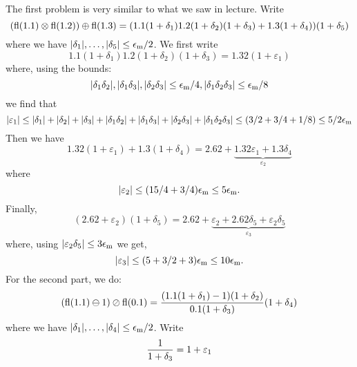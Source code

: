\documentclass[12pt,a4paper]{article}
\begin{document}
The first problem is very similar to what we saw in lecture. Write
\[
({\rm fl}(1.1)\ensuremath{\otimes} {\rm fl}(1.2)) \ensuremath{\oplus} {\rm fl}(1.3) = ( 1.1(1 + \ensuremath{\delta}_1)1.2(1+\ensuremath{\delta}_2)(1+\ensuremath{\delta}_3) + 1.3(1+\ensuremath{\delta}_4))(1+\ensuremath{\delta}_5)
\]
where we have $|\ensuremath{\delta}_1|,\ensuremath{\ldots},|\ensuremath{\delta}_5| \ensuremath{\leq} \ensuremath{\epsilon}_{\rm m}/2$. We first write
\[
1.1(1 + \ensuremath{\delta}_1)1.2(1+\ensuremath{\delta}_2)(1+\ensuremath{\delta}_3) = 1.32( 1+ \ensuremath{\varepsilon}_1)
\]
where, using the bounds:
\[
|\ensuremath{\delta}_1\ensuremath{\delta}_2|,|\ensuremath{\delta}_1\ensuremath{\delta}_3|,|\ensuremath{\delta}_2\ensuremath{\delta}_3| \ensuremath{\leq} \ensuremath{\epsilon}_{\rm m}/4, |\ensuremath{\delta}_1\ensuremath{\delta}_2\ensuremath{\delta}_3| \ensuremath{\leq} \ensuremath{\epsilon}_{\rm m}/8
\]
we find that
\[
|\ensuremath{\varepsilon}_1| \ensuremath{\leq} |\ensuremath{\delta}_1| + |\ensuremath{\delta}_2| + |\ensuremath{\delta}_3| + |\ensuremath{\delta}_1\ensuremath{\delta}_2| + |\ensuremath{\delta}_1\ensuremath{\delta}_3| + |\ensuremath{\delta}_2\ensuremath{\delta}_3|+ |\ensuremath{\delta}_1\ensuremath{\delta}_2\ensuremath{\delta}_3|
     \ensuremath{\leq} (3/2 + 3/4 + 1/8) \ensuremath{\leq} 5/2 \ensuremath{\epsilon}_{\rm m}
\]
Then we have
\[
1.32 (1 + \ensuremath{\varepsilon}_1) + 1.3 (1 + \ensuremath{\delta}_4) = 2.62 + \underbrace{1.32 \ensuremath{\varepsilon}_1 + 1.3\ensuremath{\delta}_4}_{\ensuremath{\varepsilon}_2}
\]
where
\[
|\ensuremath{\varepsilon}_2| \ensuremath{\leq} (15/4 + 3/4) \ensuremath{\epsilon}_{\rm m} \ensuremath{\leq} 5\ensuremath{\epsilon}_{\rm m}.
\]
Finally,
\[
(2.62 + \ensuremath{\varepsilon}_2)(1+\ensuremath{\delta}_5) = 2.62 + \underbrace{\ensuremath{\varepsilon}_2 + 2.62\ensuremath{\delta}_5 + \ensuremath{\varepsilon}_2 \ensuremath{\delta}_5}_{\ensuremath{\varepsilon}_3}
\]
where, using $|\ensuremath{\varepsilon}_2 \ensuremath{\delta}_5| \ensuremath{\leq} 3\ensuremath{\epsilon}_{\rm m}$ we get,
\[
|\ensuremath{\varepsilon}_3| \ensuremath{\leq} (5 + 3/2 + 3) \ensuremath{\epsilon}_{\rm m}  \ensuremath{\leq} 10\ensuremath{\epsilon}_{\rm m}.
\]
For the second part, we do:
\[
({\rm fl}(1.1) \ensuremath{\ominus} 1) \ensuremath{\oslash} {\rm fl}(0.1) = {(1.1 (1 + \ensuremath{\delta}_1) - 1)(1 + \ensuremath{\delta}_2) \over 0.1 (1 + \ensuremath{\delta}_3)} (1 + \ensuremath{\delta}_4)
\]
where we have $|\ensuremath{\delta}_1|,\ensuremath{\ldots},|\ensuremath{\delta}_4| \ensuremath{\leq} \ensuremath{\epsilon}_{\rm m}/2$. Write
\[
{1 \over 1 + \ensuremath{\delta}_3} = 1 + \ensuremath{\varepsilon}_1
\]
\end{document}
